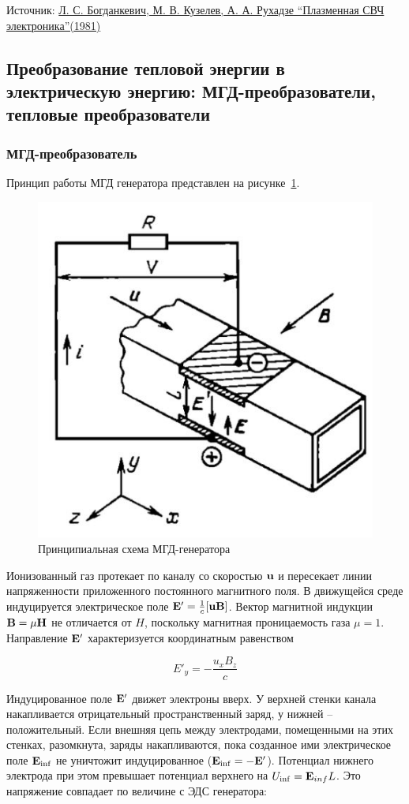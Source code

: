 \documentclass[10pt, a4paper]{article}
\begin{document}
Источник: \href{http://ufn.ru/ru/articles/1981/1/a/}{Л. С. Богданкевич, М. В. Кузелев, А. А. Рухадзе ``Плазменная СВЧ электроника''(1981)}

\subsection{Преобразование тепловой энергии в электрическую энергию: МГД-преобразователи, тепловые преобразователи}

\subsubsection{МГД-преобразователь}

Принцип работы МГД генератора представлен на рисунке~\ref{fig:MHD_generator}.

\begin{figure}[ht]
	\begin{center}
		\includegraphics[width=0.5\linewidth]{MGD_generator.JPG}
	\end{center}
	\caption{Принципиальная схема МГД-генератора~\cite{raizer}}
	\label{fig:MHD_generator}
\end{figure}

Ионизованный газ протекает по каналу со скоростью $\vb{u}$ и пересекает линии напряженности приложенного постоянного магнитного поля. В движущейся среде индуцируется электрическое поле $\vb{E}' =\frac{1}{c} [\vb{u}\vb{B}]$. Вектор магнитной индукции $\vb{B} =\mu \vb{H}$ не отличается от $H$, поскольку магнитная проницаемость газа $\mu=1$. Направление $\vb{E}'$ характеризуется координатным равенством 

\begin{equation*}
	E'_y=-\frac{u_x B_z}{c} 
\end{equation*}

Индуцированное поле $\vb{E}'$ движет электроны вверх. У верхней стенки канала накапливается отрицательный пространственный заряд, у нижней -- положительный. Если внешняя цепь между электродами, помещенными на этих стенках, разомкнута, заряды накапливаются, пока созданное ими электрическое поле $\vb{E}_{\inf}$ не уничтожит индуцированное ($\vb{E}_{\inf}=-\vb{E}'$). Потенциал нижнего электрода при этом превышает потенциал верхнего на $U_{\inf} = \vb{E}_{inf} L$. Это напряжение совпадает по величине с ЭДС генератора:
\end{document}
